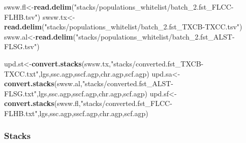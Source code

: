\documentclass[]{article}
\newenvironment{Shaded}{\begin{snugshade}}{\end{snugshade}}
\newcommand{\KeywordTok}[1]{\textcolor[rgb]{0.13,0.29,0.53}{\textbf{#1}}}
\newcommand{\DataTypeTok}[1]{\textcolor[rgb]{0.13,0.29,0.53}{#1}}
\newcommand{\DecValTok}[1]{\textcolor[rgb]{0.00,0.00,0.81}{#1}}
\newcommand{\CharTok}[1]{\textcolor[rgb]{0.31,0.60,0.02}{#1}}
\newcommand{\StringTok}[1]{\textcolor[rgb]{0.31,0.60,0.02}{#1}}
\newcommand{\OtherTok}[1]{\textcolor[rgb]{0.56,0.35,0.01}{#1}}
\newcommand{\ControlFlowTok}[1]{\textcolor[rgb]{0.13,0.29,0.53}{\textbf{#1}}}
\newcommand{\OperatorTok}[1]{\textcolor[rgb]{0.81,0.36,0.00}{\textbf{#1}}}
\newcommand{\NormalTok}[1]{#1}
\begin{document}
\begin{Shaded}
\end{Shaded}

\begin{Shaded}
\begin{Highlighting}[]
\NormalTok{swsw.fl<-}\KeywordTok{read.delim}\NormalTok{(}\StringTok{"stacks/populations_whitelist/batch_2.fst_FLCC-FLHB.tsv"}\NormalTok{)}
\NormalTok{swsw.tx<-}\KeywordTok{read.delim}\NormalTok{(}\StringTok{"stacks/populations_whitelist/batch_2.fst_TXCB-TXCC.tsv"}\NormalTok{)}
\NormalTok{swsw.al<-}\KeywordTok{read.delim}\NormalTok{(}\StringTok{"stacks/populations_whitelist/batch_2.fst_ALST-FLSG.tsv"}\NormalTok{)}

\NormalTok{upd.st<-}\KeywordTok{convert.stacks}\NormalTok{(swsw.tx,}\StringTok{"stacks/converted.fst_TXCB-TXCC.txt"}\NormalTok{,lgs,ssc.agp,sscf.agp,chr.agp,scf.agp)}
\NormalTok{upd.sa<-}\KeywordTok{convert.stacks}\NormalTok{(swsw.al,}\StringTok{"stacks/converted.fst_ALST-FLSG.txt"}\NormalTok{,lgs,ssc.agp,sscf.agp,chr.agp,scf.agp)}
\NormalTok{upd.sf<-}\KeywordTok{convert.stacks}\NormalTok{(swsw.fl,}\StringTok{"stacks/converted.fst_FLCC-FLHB.txt"}\NormalTok{,lgs,ssc.agp,sscf.agp,chr.agp,scf.agp)}
\end{Highlighting}
\end{Shaded}

\subsubsection{Stacks}\label{stacks}
\end{document}
